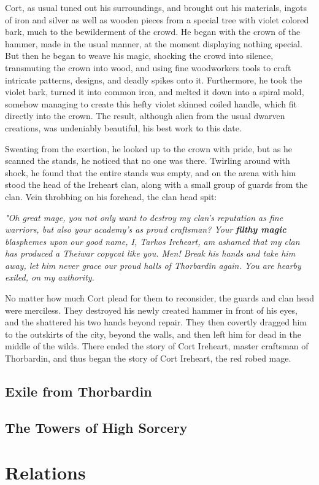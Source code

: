 \documentclass[12pt]{article}
\begin{document}
Cort, as usual tuned out his surroundings, and brought out his materials, ingots
of iron and silver as well as wooden pieces from a special tree with violet
colored bark, much to the bewilderment of the crowd. He began with the crown of
the hammer, made in the usual manner, at the moment displaying nothing special.
But then he began to weave his magic, shocking the crowd into silence,
transmuting the crown into wood, and using fine woodworkers tools to craft
intricate patterns, designs, and deadly spikes onto it. Furthermore, he took the
violet bark, turned it into common iron, and melted it down into a spiral mold,
somehow managing to create this hefty violet skinned coiled handle, which fit
directly into the crown. The result, although alien from the usual dwarven
creations, was undeniably beautiful, his best work to this date.

Sweating from the exertion, he looked up to the crown with pride, but as he
scanned the stands, he noticed that no one was there. Twirling around with
shock, he found that the entire stands was empty, and on the arena with him
stood the head of the Ireheart clan, along with a small group of guards from the
clan. Vein throbbing on his forehead, the clan head spit:

\begin{quoting}
  \textit{"Oh great mage, you not only want to destroy my clan's reputation as
  fine warriors, but also your academy's as proud craftsman? Your \textbf{filthy
  magic} blasphemes upon our good name, I, Tarkos Ireheart, am ashamed that my
  clan has produced a Theiwar copycat like you. Men! Break his hands and take
  him away, let him never grace our proud halls of Thorbardin again. You are
  hearby exiled, on my authority.}
\end{quoting}

No matter how much Cort plead for them to reconsider, the guards and clan head
were merciless. They destroyed his newly created hammer in front of his eyes, and
the shattered his two hands beyond repair. They then covertly dragged him to the
outskirts of the city, beyond the walls, and then left him for dead in the
middle of the wilds. There ended the story of Cort Ireheart, master craftsman of
Thorbardin, and thus began the story of Cort Ireheart, the red robed mage.

\subsection{Exile from Thorbardin}

\subsection{The Towers of High Sorcery}

\section{Relations}
\end{document}
